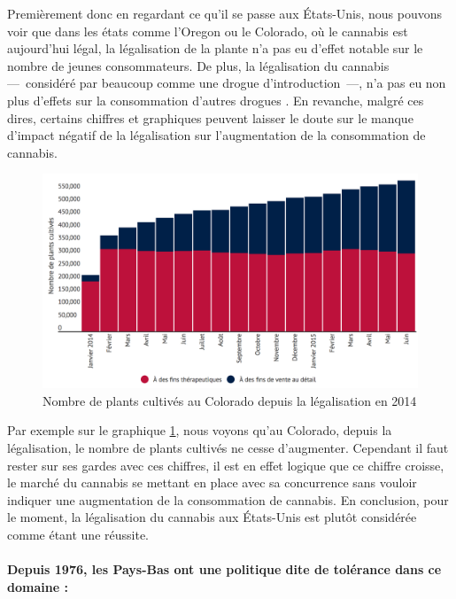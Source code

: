 Premièrement donc en regardant ce qu’il se passe aux États-Unis, nous pouvons voir que dans les états comme l’Oregon ou le Colorado, où le cannabis est aujourd’hui légal, la légalisation de la plante n’a pas eu d’effet notable sur le nombre de jeunes consommateurs. De plus, la légalisation du cannabis ---~considéré par beaucoup comme une drogue d’introduction~---, n’a pas eu non plus d’effets sur la consommation d’autres drogues \cite{reality}. En revanche, malgré ces dires, certains chiffres et graphiques peuvent laisser le doute sur le manque d’impact négatif de la légalisation sur l’augmentation de la consommation de cannabis. 

\begin{figure}\centering
	\includegraphics[width=\textwidth]{images/grapheconso.png}
    \caption{Nombre de plants cultivés au Colorado depuis la légalisation en 2014}
    \label{fig:grapheconso}
\end{figure}


Par exemple sur le graphique \ref{fig:grapheconso}, nous voyons qu’au Colorado, depuis la légalisation, le nombre de plants cultivés ne cesse d’augmenter. Cependant il faut rester sur ses gardes avec ces chiffres, il est en effet logique que ce chiffre croisse, le marché du cannabis se mettant en place avec sa concurrence sans vouloir indiquer une augmentation de la consommation de cannabis. En conclusion, pour le moment, la légalisation du cannabis aux États-Unis est plutôt considérée comme étant une réussite.

\paragraph{Depuis 1976, les Pays-Bas ont une politique dite de tolérance dans ce domaine :}


